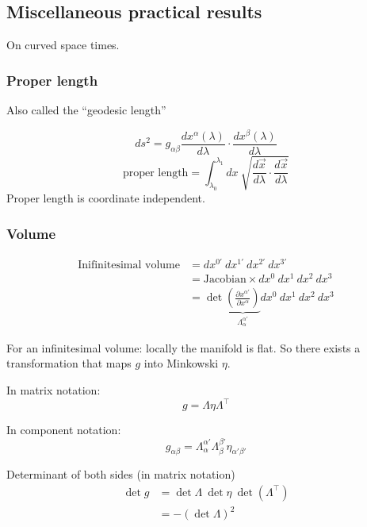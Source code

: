 \documentclass[a4paper]{article} %
\begin{document}
\subsection{Miscellaneous practical results}
On curved space times.

\subsubsection{Proper length}
Also called the ``geodesic length''

\begin{equation}
ds^2=g_{\alpha\beta}\frac{dx^{\alpha}(\lambda)}{d\lambda}\cdot \frac{dx^{\beta}(\lambda)}{d\lambda}
\end{equation}
\begin{equation}
\text{proper length}=\int^{\lambda_1}_{\lambda_0}dx~\sqrt{\frac{d\vec{x}}{d\lambda}\cdot\frac{d\vec{x}}{d\lambda}}
\end{equation}
Proper length is coordinate independent.

\subsubsection{Volume}

\begin{align}
\text{Inifinitesimal volume}&=dx^{0'}~dx^{1'}~dx^{2'}~dx^{3'}\\
&=\text{Jacobian}\times dx^0~dx^1~dx^2~dx^3\\
&=\det\underbrace{\left(\frac{\partial x^{\alpha'}}{\partial x^{\alpha}}\right)}
_{\Lambda^{\alpha'}_{\alpha}} dx^0~dx^1~dx^2~dx^3
\end{align}

For an infinitesimal volume: locally the manifold is flat. So there exists a transformation that maps $g$ into Minkowski $\eta$.

In matrix notation:
\begin{equation}
g=\Lambda\eta\Lambda^{\top}
\end{equation}

In component notation:
\begin{equation}
g_{\alpha\beta}=\Lambda^{\alpha'}_{\alpha}\Lambda^{\beta'}_{\beta}\eta_{\alpha'\beta'}
\end{equation}

Determinant of both sides (in matrix notation)
\begin{align}
\det g&=\det\Lambda~\det \eta ~ \det(\Lambda^{\top})\\
&=-(\det \Lambda)^2
\end{align}
\end{document}
